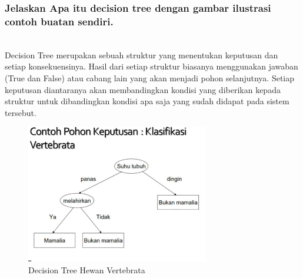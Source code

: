 \subsubsection{Jelaskan Apa itu decision tree dengan gambar ilustrasi contoh buatan sendiri.}
\hfill\\
Decision Tree merupakan sebuah struktur yang menentukan keputusan dan setiap konsekuensinya. Hasil dari setiap struktur biasanya menggunakan jawaban (True dan False) atau cabang lain yang akan menjadi pohon selanjutnya. Setiap keputusan diantaranya akan membandingkan kondisi yang diberikan kepada struktur untuk dibandingkan kondisi apa saja yang sudah didapat pada sistem tersebut.
\begin{figure}[H]
    \includegraphics[width=8cm]{figures/1174087/2/dt.png}
    \centering
    \caption{Decision Tree Hewan Vertebrata}
\end{figure}


